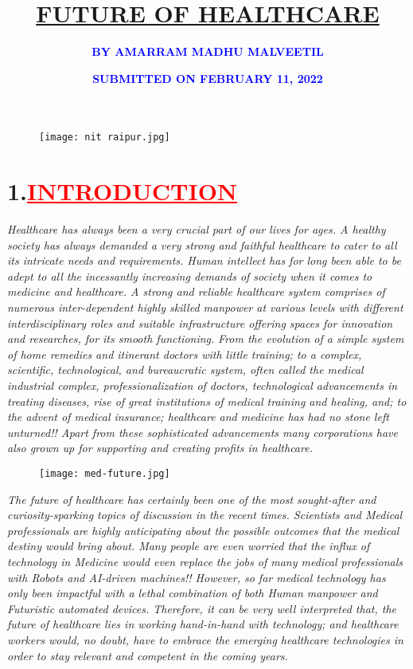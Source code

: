 \documentclass[12pt]{article}
\title{\textbf{\textcolor{PineGreen}{\underline{FUTURE OF HEALTHCARE}}}}
\author{\textbf{\textcolor{Blue}{BY AMARRAM MADHU MALVEETIL}}}
\affil[]{\textcolor{Blue}{\textbf{ROLL NO.:21111009}}}
\affil[]{\textbf{\textcolor{Brown}{"Department of BIOMEDICAL ENGINEERING"}}}
\affil[]{\textbf{\textcolor{RedViolet}{"NATIONAL INSTITUTE OF TECHNOLOGY, RAIPUR", CHATTISGARH"}}}
\affil[]{\textbf{\textcolor{Blue}{BATCH:2025\hspace{2cm}SEMESTER:I}}}
\affil[]{\textbf{\textcolor{Maroon}{Assignment 3 of"BASIC BIOMEDICAL ENGINEERING"}}}
\date{\textbf{\textcolor{Blue}{SUBMITTED ON FEBRUARY 11, 2022}}}
\begin{document}
\begin{figure}
    \centering
    \texttt{[image: nit raipur.jpg]}
\end{figure}

\maketitle
\newpage
\section*{\textbf{1.\hspace{1cm}\textcolor{red}{\underline{\huge{INTRODUCTION}}}}}
\hspace{1cm}\large{\emph{Healthcare has always been a very crucial part of our lives for ages. A healthy society has always demanded a very strong and faithful healthcare to cater to all its intricate needs and requirements. Human intellect has for long been able to be adept to all the incessantly increasing demands of society when it comes to medicine and healthcare. A strong and reliable healthcare system comprises of numerous inter-dependent highly skilled manpower at various levels with different interdisciplinary roles and suitable infrastructure offering spaces for innovation and researches, for its smooth functioning.}}\vspace{1cm}\newline 
\hspace{1cm}\large{\emph{From the evolution of a simple system of home remedies and itinerant doctors with little training; to a complex, scientific, technological, and bureaucratic system, often called the medical industrial complex, professionalization of doctors, technological advancements in treating diseases, rise of great institutions of medical training and healing, and; to the advent of medical insurance; healthcare and medicine has had no stone left unturned!! Apart from these sophisticated advancements many corporations have also grown up for supporting and creating profits in healthcare.}}\newpage
\begin{figure}
    \centering
    \texttt{[image: med-future.jpg]}
\end{figure}
\hspace{1cm}\large{\emph{The future of healthcare has certainly been one of the most sought-after and curiosity-sparking topics of discussion in the recent times. Scientists and Medical professionals are highly anticipating about the possible outcomes that the medical destiny would bring about. Many people are even worried that the influx of technology in Medicine would even replace the jobs of many medical professionals with Robots and AI-driven machines!! However, so far medical technology has only been impactful with a lethal combination of both Human manpower and Futuristic automated devices. Therefore, it can be very well interpreted that, the future of healthcare lies in working hand-in-hand with technology; and healthcare workers would, no doubt, have to embrace the emerging healthcare technologies in order to stay relevant and competent in the coming years.}}\vspace{1cm}\newline
\end{document}

